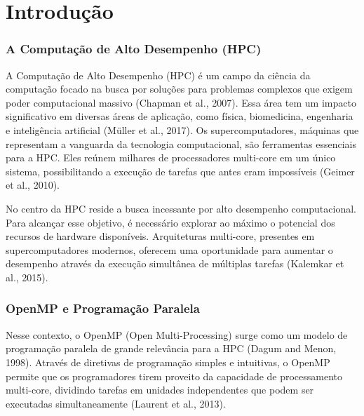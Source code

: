 \documentclass[ppgc,diss]{iiufrgs}
\begin{document}


\listoftables

\tableofcontents


\chapter{Introdução}
\subsection{A Computação de Alto Desempenho (HPC)}
A Computação de Alto Desempenho (HPC) é um campo da ciência da computação focado na busca por soluções para problemas complexos que exigem poder computacional massivo (Chapman et al., 2007). Essa área tem um impacto significativo em diversas áreas de aplicação, como física, biomedicina, engenharia e inteligência artificial (Müller et al., 2017).
Os supercomputadores, máquinas que representam a vanguarda da tecnologia computacional, são ferramentas essenciais para a HPC. Eles reúnem milhares de processadores multi-core em um único sistema, possibilitando a execução de tarefas que antes eram impossíveis (Geimer et al., 2010).

No centro da HPC reside a busca incessante por alto desempenho computacional. Para alcançar esse objetivo, é necessário explorar ao máximo o potencial dos recursos de hardware disponíveis. Arquiteturas multi-core, presentes em supercomputadores modernos, oferecem uma oportunidade para aumentar o desempenho através da execução simultânea de múltiplas tarefas (Kalemkar et al., 2015).

\subsection{OpenMP e Programação Paralela}
Nesse contexto, o OpenMP (Open Multi-Processing) surge como um modelo de programação paralela de grande relevância para a HPC (Dagum and Menon, 1998). Através de diretivas de programação simples e intuitivas, o OpenMP permite que os programadores tirem proveito da capacidade de processamento multi-core, dividindo tarefas em unidades independentes que podem ser executadas simultaneamente (Laurent et al., 2013).
\end{document}
